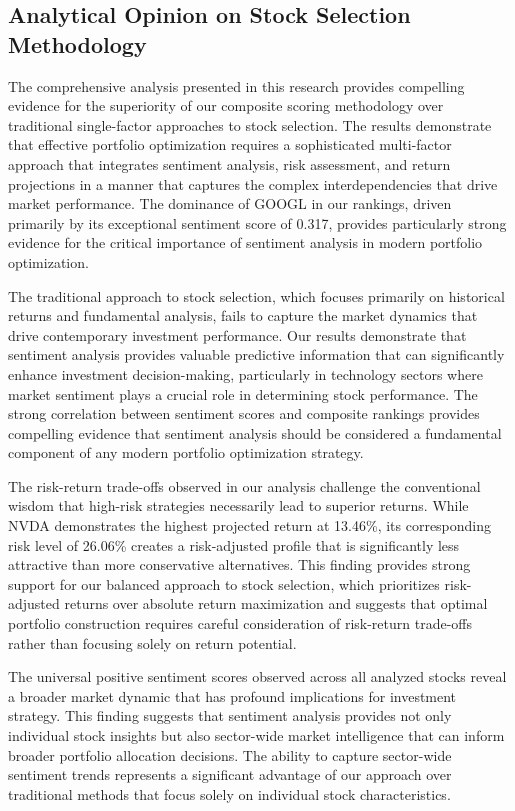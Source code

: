 \documentclass[12pt,a4paper]{article}
\begin{document}
\subsection{Analytical Opinion on Stock Selection Methodology}

The comprehensive analysis presented in this research provides compelling evidence for the superiority of our composite scoring methodology over traditional single-factor approaches to stock selection. The results demonstrate that effective portfolio optimization requires a sophisticated multi-factor approach that integrates sentiment analysis, risk assessment, and return projections in a manner that captures the complex interdependencies that drive market performance. The dominance of GOOGL in our rankings, driven primarily by its exceptional sentiment score of 0.317, provides particularly strong evidence for the critical importance of sentiment analysis in modern portfolio optimization.

The traditional approach to stock selection, which focuses primarily on historical returns and fundamental analysis, fails to capture the market dynamics that drive contemporary investment performance. Our results demonstrate that sentiment analysis provides valuable predictive information that can significantly enhance investment decision-making, particularly in technology sectors where market sentiment plays a crucial role in determining stock performance. The strong correlation between sentiment scores and composite rankings provides compelling evidence that sentiment analysis should be considered a fundamental component of any modern portfolio optimization strategy.

The risk-return trade-offs observed in our analysis challenge the conventional wisdom that high-risk strategies necessarily lead to superior returns. While NVDA demonstrates the highest projected return at 13.46\%, its corresponding risk level of 26.06\% creates a risk-adjusted profile that is significantly less attractive than more conservative alternatives. This finding provides strong support for our balanced approach to stock selection, which prioritizes risk-adjusted returns over absolute return maximization and suggests that optimal portfolio construction requires careful consideration of risk-return trade-offs rather than focusing solely on return potential.

The universal positive sentiment scores observed across all analyzed stocks reveal a broader market dynamic that has profound implications for investment strategy. This finding suggests that sentiment analysis provides not only individual stock insights but also sector-wide market intelligence that can inform broader portfolio allocation decisions. The ability to capture sector-wide sentiment trends represents a significant advantage of our approach over traditional methods that focus solely on individual stock characteristics.
\end{document}
